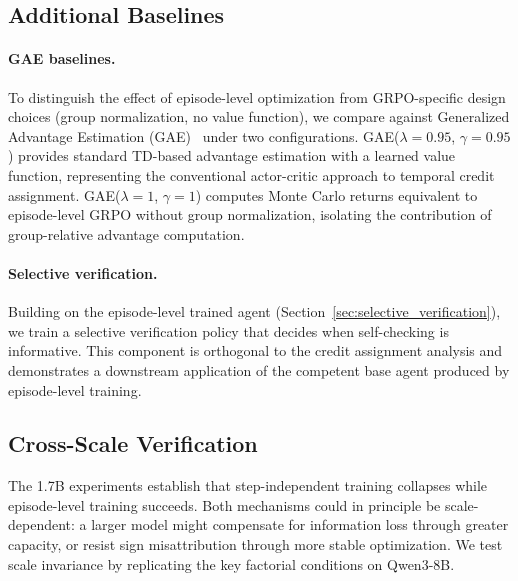\subsection{Additional Baselines}
\label{sec:additional_baselines}

\paragraph{GAE baselines.}
To distinguish the effect of episode-level optimization from GRPO-specific design choices (group normalization, no value function), we compare against Generalized Advantage Estimation (GAE)~\cite{schulman2016gae} under two configurations. GAE($\lambda = 0.95$, $\gamma = 0.95$) provides standard TD-based advantage estimation with a learned value function, representing the conventional actor-critic approach to temporal credit assignment. GAE($\lambda = 1$, $\gamma = 1$) computes Monte Carlo returns equivalent to episode-level GRPO without group normalization, isolating the contribution of group-relative advantage computation. 

\paragraph{Selective verification.}
Building on the episode-level trained agent (Section~\ref{sec:selective_verification}), we train a selective verification policy that decides when self-checking is informative. This component is orthogonal to the credit assignment analysis and demonstrates a downstream application of the competent base agent produced by episode-level training. 

\subsection{Cross-Scale Verification}
\label{sec:cross_scale}

The 1.7B experiments establish that step-independent training collapses while episode-level training succeeds. Both mechanisms could in principle be scale-dependent: a larger model might compensate for information loss through greater capacity, or resist sign misattribution through more stable optimization. We test scale invariance by replicating the key factorial conditions on Qwen3-8B.

